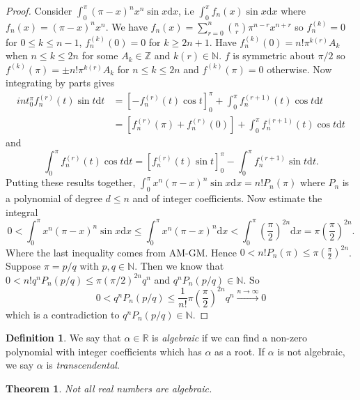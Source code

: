 \documentclass[a4paper, 10pt, twocolumn]{amsart}
\newtheorem*{theorem}{Theorem}
\theoremstyle{definition}
\newtheorem*{definition}{Definition}
\newcommand{\bb}[1]{\mathbb{#1}}
\newcommand{\too}{\xrightarrow}
\newcommand{\1}{\mathbbm{1}}
\begin{document}
\begin{proof}
    Consider $\int_0^{\pi} (\pi-x)^nx^n\sin{x}\mathrm{d}x$, i.e $\int_0^\pi f_n(x)\sin{x}\mathrm{d}x$ where $f_n(x) = (\pi-x)^nx^n$. We have $f_n(x) =\sum_{r=0}^n \binom{n}{r} \pi^{n-r}x^{n+r}$ so $f_n^{(k)} = 0$ for $0\le k\le n-1$, $f_n^{(k)}(0)=0$ for $k\ge 2n+1$. Have $f_n^{(k)}(0) = n!\pi^{k(r)}A_k$ when $n\le k\le 2n$ for some $A_k \in \bb{Z}$ and $k(r) \in \bb{N}$. $f$ is symmetric about $\pi/2$ so $f^{(k)}(\pi) = \pm n! \pi^{k(r)}A_k$ for $n\le k\le 2n$ and $f^{(k)}(\pi) = 0$ otherwise. Now integrating by parts gives \begin{align*}
        int_0^\pi f_n^{(r)}(t)\sin{t}\mathrm{d}t &= \left[-f_n^{(r)}(t)\cos{t}\right]_0^\pi + \int_0^\pi f_n^{(r+1)}(t)\cos{t}\mathrm{d}t\\
        &= \left[f_n^{(r)}(\pi)+f_n^{(r)}(0)\right] + \int_0^\pi f_n^{(r+1)}(t)\cos{t}\mathrm{d}t
    \end{align*}
    and \[\int_0^\pi f_n^{(r)}(t)\cos{t}\mathrm{d}t = \left[f_n^{(r)}(t)\sin{t}\right]_0^\pi - \int_0^\pi f_n^{(r+1)}\sin{t}\mathrm{d}t.\]
    Putting these results together, $\int_0^\pi x^n(\pi-x)^n \sin{x}\mathrm{d}x = n! P_n(\pi)$ where $P_n$ is a polynomial of degree $d\le n$ and of integer coefficients. Now estimate the integral \[0<\int_0^\pi x^n(\pi-x)^n\sin{x}\mathrm{d}x \le \int_0^\pi x^n(\pi-x)^n \mathrm{d}x < \int_0^\pi \left(\frac{\pi}{2}\right)^{2n}\mathrm{d}x = \pi\left(\frac{\pi}{2}\right)^{2n}.\]
    Where the last inequality comes from AM-GM. Hence $0<n!P_n(\pi) \le \pi \left(\frac{\pi}{2}\right)^{2n}$. Suppose $\pi = p/q$ with $p,q \in \bb{N}$. Then we know that $0<n! q^n P_n(p/q)\le \pi(\pi/2)^{2n} q^n$ and $q^n P_n(p/q) \in \bb{N}$. So \[0<q^n P_n(p/q) \le \frac{1}{n!} \pi\left(\frac{\pi}{2}\right)^{2n} q^n \too{n \to \infty}0\]
    which is a contradiction to $q^nP_n(p/q) \in \bb{N}$.  
\end{proof}





\begin{definition}
    We say that $\alpha \in \bb{R}$ is \textit{algebraic} if we can find a non-zero polynomial with integer coefficients which has $\alpha$ as a root. If $\alpha$ is not algebraic, we say $\alpha$ is \textit{transcendental}.
\end{definition}

\begin{theorem}
    Not all real numbers are algebraic.
\end{theorem}
\end{document}

